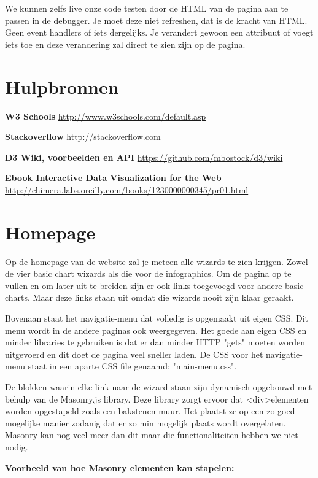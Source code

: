 We kunnen zelfs live onze code testen door de HTML van de pagina aan te passen in de debugger. Je moet deze niet refreshen, dat is de kracht van HTML. Geen event handlers of iets dergelijks. Je verandert gewoon een attribuut of voegt iets toe en deze verandering zal direct te zien zijn op de pagina.

\section{Hulpbronnen}

\textbf{W3 Schools}
\url{http://www.w3schools.com/default.asp}

\textbf{Stackoverflow}
\url{http://stackoverflow.com}

\textbf{D3 Wiki, voorbeelden en API}
\url{https://github.com/mbostock/d3/wiki}

\textbf{Ebook Interactive Data Visualization for the Web}
\url{http://chimera.labs.oreilly.com/books/1230000000345/pr01.html}

\section{Homepage}

Op de homepage van de website zal je meteen alle wizards te zien krijgen. Zowel de vier basic chart wizards als die voor de infographics. Om de pagina op te vullen en om later uit te breiden zijn er ook links toegevoegd voor andere basic charts. Maar deze links staan uit omdat die wizards nooit zijn klaar geraakt.

Bovenaan staat het navigatie-menu dat volledig is opgemaakt uit eigen CSS. Dit menu wordt in de andere paginas ook weergegeven. Het goede aan eigen CSS en minder libraries te gebruiken is dat er dan minder HTTP "gets" moeten worden uitgevoerd en dit doet de pagina veel sneller laden. De CSS voor het navigatie-menu staat in een aparte CSS file genaamd: "main-menu.css".

De blokken waarin elke link naar de wizard staan zijn dynamisch opgebouwd met behulp van de Masonry.js library. Deze library zorgt ervoor dat \textless div\textgreater  elementen worden opgestapeld zoals een bakstenen muur. Het plaatst ze op een zo goed mogelijke manier zodanig dat er zo min mogelijk plaats wordt overgelaten. Masonry kan nog veel meer dan dit maar die functionaliteiten hebben we niet nodig.


\textbf{Voorbeeld van hoe Masonry elementen kan stapelen:}

